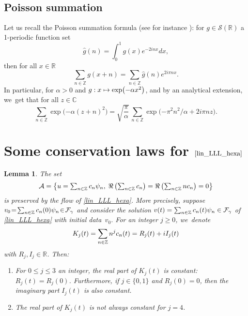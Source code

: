 \documentclass[JEP,XML,SOM,Unicode,NoFloatCountersInSection,published]{cedram}
\newcommand\mto{\mathchoice{\longmapsto}{\mapsto}{\mapsto}{\mapsto}}
\newtheorem{lemme}[theorem]{Lemma}
\theoremstyle{definition}
\let\EE\exp
\let\dis\relax
\newcommand\C{\mathbb C}
\newcommand\R{\mathbb R}
\newcommand\Z{\mathbb Z}
\newcommand{\pa}[1]{\left(#1\right)}
\newcommand{\paa}[1]{\left\{#1\right\}}
\begin{document}
\subsection{Poisson summation}
Let us recall the Poisson summation formula (see for instance \cite[Chap.\,VII]{SteinWeiss}): for $g \in \mathscr{S}(\R)$ a 1-periodic function set
\[
\hat{g}(n)=\int_0^1g(x)e^{-2inx}dx,
\]
then for all $ x \in \R$
\begin{equation}\label{PF}
\sum_{n \in \Z}g(x+n)=\sum_{n \in \Z}\hat{g}(n)e^{2i \pi n x}.
\end{equation}
In particular, for $\alpha >0$ and $g: x \mto \EE\bigl({-\alpha x^2}\bigr)$, and by an analytical extension, we~get that for all $z \in \C$
\begin{equation}\label{PF1}
\sum_{n \in \Z} \EE\bigl({-\alpha (z+n)^2}\bigr) =\sqrt{\frac{\pi}{\alpha}}\, \sum_{n \in \Z} \EE\bigl({-{\pi^2 n^2 }/{\alpha}+2 i \pi n z}\bigr).
\end{equation}

\section{Some conservation laws for \texorpdfstring{$\ref{lin_LLL_hexa}$}{ref}}

\begin{lemme}\label{lemme_conserv_hyp1}
The set\vspace*{-3pt}
\[\textstyle
\dis \mathcal{A} = \paa{ u = \sum_{n\in\Z} c_n\psi_n, \; \Re\pa{\sum_{n\in\Z}c_n} = \Re\pa{\sum_{n\in\Z}nc_n} = 0 } 
\]
is preserved by the flow of \eqref{lin_LLL_hexa}. More precisely, suppose \hbox{$\dis v_0 \!=\! \sum_{n\in\Z} c_n(0)\psi_n \!\in\! \mathcal{F}_\gamma$} and consider the solution $\dis v(t)= \sum_{n\in\Z} c_n(t)\psi_n \in \mathcal{F}_\gamma$ of \eqref{lin_LLL_hexa} with initial data~$v_0$. For an integer $j \geq 0$, we~denote\vspace*{-3pt}
\[
\dis K_j(t) = \sum_{n\in\Z}{n^jc_n(t)} = R_j(t) +iI_j(t)
\]
with $R_j,I_j \in \R$. Then:
\begin{enumerate}
\item For $0 \leq j \leq 3$ an integer, the real part of $K_j(t)$ is constant: $R_j(t) = R_j(0)$. Furthermore, if $j\in\{ 0,1\}$ and $R_j(0) = 0$, then the imaginary part $I_j(t)$ is also constant.
\item The real part of $K_j(t)$ is \emph{not always} constant for $j = 4$.
\end{enumerate}
\end{lemme}
\end{document}
